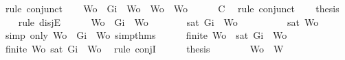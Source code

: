 \begin{isabellebody}
\ {\isacharparenleft}rule\ conjunct{}{\isacharparenright}\isanewline
\ \ \isamarkupfalse%
\ {\isachardoublequoteopen}Wo\ {\isacharequal}\ {\isacharbraceleft}Gi{\isacharbraceright}\ {\isasymunion}\ Wo{\isacharprime}\ {\isasymor}\ Wo\ {\isacharequal}\ Wo{\isacharprime}{\isachardoublequoteclose}\isanewline
\ \ \ \ \isamarkupfalse%
\ C{}\ \isamarkupfalse%
\ {\isacharparenleft}rule\ conjunct{}{\isacharparenright}\isanewline
\ \ \isamarkupfalse%
\ {\isacharquery}thesis\isanewline
\ \ \isamarkupfalse%
\ {\isacharparenleft}rule\ disjE{\isacharparenright}\isanewline
\ \ \ \ \isamarkupfalse%
\ {\isachardoublequoteopen}Wo\ {\isacharequal}\ {\isacharbraceleft}Gi{\isacharbraceright}\ {\isasymunion}\ Wo{\isacharprime}{\isachardoublequoteclose}\isanewline
\ \ \ \ \isamarkupfalse%
\ \isamarkupfalse%
\ {\isachardoublequoteopen}{\isasymnot}{\isacharparenleft}sat\ {\isacharparenleft}{\isacharbraceleft}Gi{\isacharbraceright}\ {\isasymunion}\ Wo{\isacharprime}{\isacharparenright}{\isacharparenright}{\isachardoublequoteclose}\ \isanewline
\ \ \ \ \ \ \isamarkupfalse%
\ {\isacartoucheopen}{\isasymnot}\ sat\ Wo{\isacartoucheclose}\ \isamarkupfalse%
\ {\isacharparenleft}simp\ only{\isacharcolon}\ {\isacartoucheopen}Wo\ {\isacharequal}\ {\isacharbraceleft}Gi{\isacharbraceright}\ {\isasymunion}\ Wo{\isacharprime}{\isacartoucheclose}\ simp{\isacharunderscore}thms{\isacharparenleft}{}{\isacharparenright}{\isacharparenright}\isanewline
\ \ \ \ \isamarkupfalse%
\ {\isachardoublequoteopen}finite\ Wo{\isacharprime}\ {\isasymand}\ {\isasymnot}{\isacharparenleft}sat\ {\isacharparenleft}{\isacharbraceleft}Gi{\isacharbraceright}\ {\isasymunion}\ Wo{\isacharprime}{\isacharparenright}{\isacharparenright}{\isachardoublequoteclose}\isanewline
\ \ \ \ \ \ \isamarkupfalse%
\ {\isacartoucheopen}finite\ Wo{\isacharprime}{\isacartoucheclose}\ {\isacartoucheopen}{\isasymnot}{\isacharparenleft}sat\ {\isacharparenleft}{\isacharbraceleft}Gi{\isacharbraceright}\ {\isasymunion}\ Wo{\isacharprime}{\isacharparenright}{\isacharparenright}{\isacartoucheclose}\ \isamarkupfalse%
\ {\isacharparenleft}rule\ conjI{\isacharparenright}\isanewline
\ \ \ \ \isamarkupfalse%
\ {\isacharquery}thesis\isanewline
\ \ \ \ \ \ \isamarkupfalse%
\ {\isacartoucheopen}Wo{\isacharprime}\ {\isasymsubseteq}\ W{\isacartoucheclose}\ \isamarkupfalse%

\end{isabellebody}
